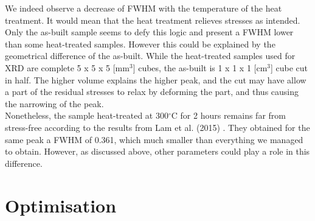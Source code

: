 We indeed observe a decrease of FWHM with the temperature of the heat treatment. It would mean that the heat treatment relieves stresses as intended. Only the as-built sample seems to defy this logic and present a FWHM lower than some heat-treated samples. However this could be explained by the geometrical difference of the as-built. While the heat-treated samples used for XRD are complete 5 x 5 x 5 [mm$^3$] cubes, the as-built is 1 x 1 x 1 [cm$^3$] cube cut in half. The higher volume explains the higher peak, and the cut may have allow a part of the residual stresses to relax by deforming the part, and thus causing the narrowing of the peak.\\

Nonetheless, the sample heat-treated at 300$^\circ$C for 2 hours remains far from stress-free according to the results from Lam et al. (2015) \cite{Lam15}. They obtained for the same peak a FWHM of 0.361, which much smaller than everything we managed to obtain. However, as discussed above, other parameters could play a role in this difference.

\section{Optimisation}



